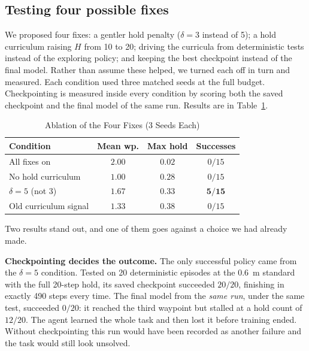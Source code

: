 \documentclass[conference]{IEEEtran}
\begin{document}
\subsection{Testing four possible fixes}
\label{sec:ablation}

We proposed four fixes: a gentler hold penalty ($\delta = 3$ instead of 5); a
hold curriculum raising $H$ from 10 to 20; driving the curricula from
deterministic tests instead of the exploring policy; and keeping the best
checkpoint instead of the final model. Rather than assume these helped, we
turned each off in turn and measured. Each condition used three matched seeds
at the full budget. Checkpointing is measured inside every condition by scoring
both the saved checkpoint and the final model of the same run. Results are in
Table~\ref{tab:ablation}.

\begin{table}[htbp]
\caption{Ablation of the Four Fixes (3 Seeds Each)}
\begin{center}
\setlength{\tabcolsep}{4pt}
\begin{tabular}{lccc}
\toprule
\textbf{Condition} & \textbf{Mean wp.} & \textbf{Max hold} &
\textbf{Successes} \\
\midrule
All fixes on & $2.00$ & $0.02$ & $0/15$ \\
No hold curriculum & $1.00$ & $0.28$ & $0/15$ \\
$\delta = 5$ (not 3) & $1.67$ & $0.33$ & $\mathbf{5/15}$ \\
Old curriculum signal & $1.33$ & $0.38$ & $0/15$ \\
\bottomrule
\end{tabular}
\label{tab:ablation}
\end{center}
\end{table}

Two results stand out, and one of them goes against a choice we had already
made.

\textbf{Checkpointing decides the outcome.} The only successful policy came
from the $\delta = 5$ condition. Tested on 20 deterministic episodes at the
$0.6$~m standard with the full 20-step hold, its saved checkpoint succeeded
$20/20$, finishing in exactly 490 steps every time. The final model from the
\emph{same run}, under the same test, succeeded $0/20$: it reached the third
waypoint but stalled at a hold count of $12/20$. The agent learned the whole
task and then lost it before training ended. Without checkpointing this run
would have been recorded as another failure and the task would still look
unsolved.
\end{document}
